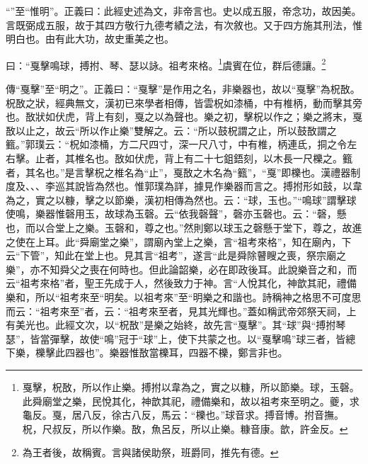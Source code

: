 {\noindent\shu{}\fzkt “”至“惟明”。正義曰：此經史述為文，非帝言也。史以成五服，帝念功，故因美。言既弼成五服，故于其四方敬行九德考績之法，有次敘也。又于四方施其刑法，惟明白也。由有此大功，故史重美之也。 \par}

曰：“戛擊鳴球，搏拊、琴、瑟以詠。祖考來格。\footnote{戛擊，柷敔，所以作止樂。搏拊以韋為之，實之以糠，所以節樂。球，玉磬。此舜廟堂之樂，民悅其化，神歆其祀，禮備樂和，故以祖考來至明之。夔，求龜反。戛，居八反，徐古八反，馬云：“櫟也。”球音求。搏音博。拊音撫。柷，尺叔反，所以作樂。敔，魚呂反，所以止樂。糠音康。歆，許金反。}虞賓在位，群后德讓。\footnote{為王者後，故稱賓。言與諸侯助祭，班爵同，推先有德。}


{\noindent\zhuan{}\fzbyks 傳“戛擊”至“明之”。正義曰：“戛擊”是作用之名，非樂器也，故以“戛擊”為柷敔。柷敔之狀，經典無文，漢初已來學者相傳，皆雲柷如漆桶，中有椎柄，動而擊其旁也。敔狀如伏虎，背上有刻，戛之以為聲也。樂之初，擊柷以作之；樂之將末，戛敔以止之，故云“所以作止樂”雙解之。云：“所以鼓柷謂之止，所以鼓敔謂之籈。”郭璞云：“柷如漆桶，方二尺四寸，深一尺八寸，中有椎，柄連氐，挏之令左右擊。止者，其椎名也。敔如伏虎，背上有二十七鉏鋙刻，以木長一尺櫟之。籈者，其名也。”是言擊柷之椎名為“止”，戛敔之木名為“籈”，“戛”即櫟也。漢禮器制度及、、、李巡其說皆為然也。惟郭璞為詳，據見作樂器而言之。搏拊形如鼓，以韋為之，實之以糠，擊之以節樂，漢初相傳為然也。云：“球，玉也。”“鳴球”謂擊球使鳴，樂器惟磬用玉，故球為玉磬。云“依我磬聲”，磬亦玉磬也。云：“磬，懸也，而以合堂上之樂。玉磬和，尊之也。”然則鄭以球玉之磬懸于堂下，尊之，故進之使在上耳。此“舜廟堂之樂”，謂廟內堂上之樂，言“祖考來格”，知在廟內，下云“下管”，知此在堂上也。見其言“祖考”，遂言“此是舜除瞽瞍之喪，祭宗廟之樂”，亦不知舜父之喪在何時也。但此論韶樂，必在即政後耳。此說樂音之和，而云“祖考來格”者，聖王先成于人，然後致力于神。言“人悅其化，神歆其祀，禮備樂和，所以“祖考來至“明矣。以祖考來”至“明樂之和諧也。詩稱神之格思不可度思而云：“祖考來至”者，云：“祖考來至者，見其光輝也。”蓋如稱武帝郊祭天祠，上有美光也。此經文次，以“柷敔”是樂之始終，故先言“戛擊”。其“球”與“搏拊琴瑟”，皆當彈擊，故使“鳴”冠于“球”上，使下共蒙之也。以“戛擊鳴”球三者，皆總下樂，櫟擊此四器也”。樂器惟敔當櫟耳，四器不櫟，鄭言非也。 \par}

